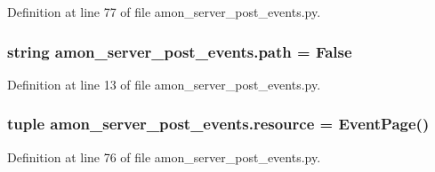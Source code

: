 Definition at line 77 of file amon\-\_\-server\-\_\-post\-\_\-events.\-py.

\hypertarget{namespaceamon__server__post__events_a3394c937469c08d57c45dc954e46d2d1}{
\subsubsection[{path}]{\setlength{\rightskip}{0pt plus 5cm}string amon\-\_\-server\-\_\-post\-\_\-events.\-path = False}}\label{namespaceamon__server__post__events_a3394c937469c08d57c45dc954e46d2d1}


Definition at line 13 of file amon\-\_\-server\-\_\-post\-\_\-events.\-py.

\hypertarget{namespaceamon__server__post__events_a1291557fb5d0cbcce136ead0b455db44}{
\subsubsection[{resource}]{\setlength{\rightskip}{0pt plus 5cm}tuple amon\-\_\-server\-\_\-post\-\_\-events.\-resource = {\bf Event\-Page}()}}\label{namespaceamon__server__post__events_a1291557fb5d0cbcce136ead0b455db44}


Definition at line 76 of file amon\-\_\-server\-\_\-post\-\_\-events.\-py.

